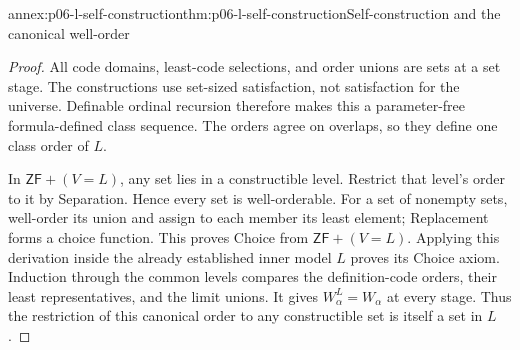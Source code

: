 \begin{annexitem}{annex:p06-l-self-construction}{thm:p06-l-self-construction}{Self-construction and the canonical well-order}
\begin{proof}
All code domains, least-code selections, and order unions
are sets at a set stage. The constructions use set-sized
satisfaction, not satisfaction for the universe.
Definable ordinal recursion therefore makes this a
parameter-free formula-defined class sequence.
The orders agree on overlaps, so they define one class
order of \(L\).

In \(\mathsf{ZF}+(V=L)\), any set lies in a constructible
level. Restrict that level's order to it by Separation.
Hence every set is well-orderable.
For a set of nonempty sets, well-order its union and assign
to each member its least element; Replacement forms a
choice function. This proves Choice from \(\mathsf{ZF}+(V=L)\).
Applying this derivation inside the already established
inner model \(L\) proves its Choice axiom.
Induction through the common levels compares the definition-code
orders, their least representatives, and the limit unions.
It gives \(W_\alpha^L=W_\alpha\) at every stage.
Thus the restriction of this canonical order to any constructible
set is itself a set in \(L\).
\end{proof}
\end{annexitem}

